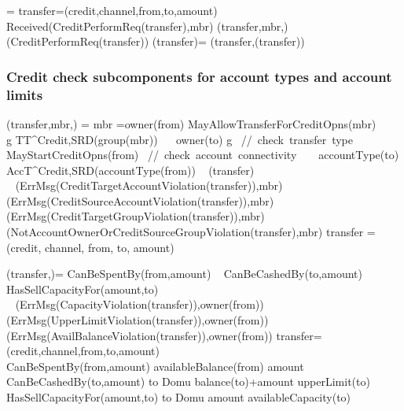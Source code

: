  
 \begin{asm}
  =\+
 \LET transfer=(credit,channel,from,to,amount)\\
 \IF Received(CreditPerformReq(transfer),\FROM mbr) \THEN \+  
 (transfer,mbr,)\\
 (CreditPerformReq(transfer))\-
 \WHERE \+
 (transfer)=\+
 (transfer,(transfer))
 \end{asm}
 
 \subsubsection{Credit check subcomponents for account types and account limits} 
 
 \begin{asm}
 	(transfer,mbr,)  =\+
 	\IF mbr =owner(from) \AND MayAllowTransferForCreditOpns(mbr) \+
 	\THEN ~ \IF ~ \FORSOME g \in TT^{Credit,SRD}(group(mbr)) 
 	~~ owner(to) \in g   \mbox{  // check transfer type}\+
 	\THEN  ~ \IF MayStartCreditOpns(from) 
 	\mbox{  // check account connectivity}\+
 	\THEN ~ \IF ~ accountType(to) \in 
 	AccT^{Credit,SRD}(accountType(from))\+
 	\THEN ~ (transfer) \\
 	\ELSE ~ (ErrMsg(CreditTargetAccountViolation(transfer)),\TO mbr) \-
 	\ELSE ~ (ErrMsg(CreditSourceAccountViolation(transfer)),\TO mbr)\-
 	\ELSE ~ (ErrMsg(CreditTargetGroupViolation(transfer)),\TO mbr) \- 
 	\ELSE ~  (NotAccountOwnerOrCreditSourceGroupViolation(transfer),\TO mbr)\dec\dec\-
 	\WHERE \+
 	transfer = (credit, channel, from, to, amount)   
 \end{asm}
 
 \begin{asm}
 (transfer,)=\+
 \IF CanBeSpentBy(from,amount) \+
 \THEN ~ \IF CanBeCashedBy(to,amount) \+
 \THEN ~ \IF HasSellCapacityFor(amount,to) \+
 \THEN ~  \\
 \ELSE 
 ~ (ErrMsg(CapacityViolation(transfer)),\TO owner(from))\-
 \ELSE 
 ~ (ErrMsg(UpperLimitViolation(transfer)),\TO owner(from))\-
 \ELSE 
 ~ (ErrMsg(AvailBalanceViolation(transfer)),\TO owner(from))\dec\-
 \WHERE \+
 transfer=(credit,channel,from,to,amount)\\
 CanBeSpentBy(from,amount) \IFF availableBalance(from) \geq amount \\
 CanBeCashedBy(to,amount) \IFF  
 to \not \in Domu \AND balance(to)+amount \leq upperLimit(to) \\
 HasSellCapacityFor(amount,to) \IFF  to \not \in Domu \AND   amount \leq availableCapacity(to)
 \end{asm}


